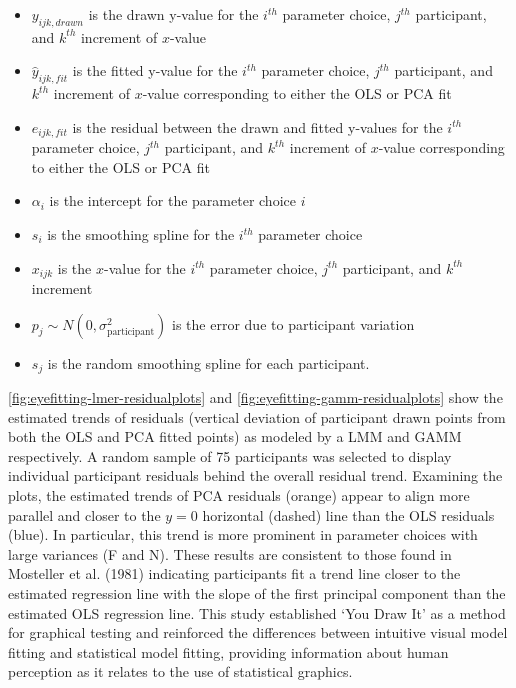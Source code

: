 \documentclass[print]{nuthesis}
\providecommand{\tightlist}{%
  \setlength{\itemsep}{0pt}\setlength{\parskip}{0pt}}
\begin{document}
\begin{itemize}
\tightlist
\item
  \(y_{ijk,drawn}\) is the drawn y-value for the \(i^{th}\) parameter choice, \(j^{th}\) participant, and \(k^{th}\) increment of \(x\)-value
\item
  \(\hat y_{ijk,fit}\) is the fitted y-value for the \(i^{th}\) parameter choice, \(j^{th}\) participant, and \(k^{th}\) increment of \(x\)-value corresponding to either the OLS or PCA fit
\item
  \(e_{ijk,fit}\) is the residual between the drawn and fitted y-values for the \(i^{th}\) parameter choice, \(j^{th}\) participant, and \(k^{th}\) increment of \(x\)-value corresponding to either the OLS or PCA fit
\item
  \(\alpha_i\) is the intercept for the parameter choice \(i\)
\item
  \(s_{i}\) is the smoothing spline for the \(i^{th}\) parameter choice
\item
  \(x_{ijk}\) is the \(x\)-value for the \(i^{th}\) parameter choice, \(j^{th}\) participant, and \(k^{th}\) increment
\item
  \(p_{j} \sim N(0, \sigma^2_\text{participant})\) is the error due to participant variation
\item
  \(s_{j}\) is the random smoothing spline for each participant.
\end{itemize}

\cref{fig:eyefitting-lmer-residualplots} and \cref{fig:eyefitting-gamm-residualplots} show the estimated trends of residuals (vertical deviation of participant drawn points from both the OLS and PCA fitted points) as modeled by a LMM and GAMM respectively.
A random sample of 75 participants was selected to display individual participant residuals behind the overall residual trend.
Examining the plots, the estimated trends of PCA residuals (orange) appear to align more parallel and closer to the \(y=0\) horizontal (dashed) line than the OLS residuals (blue).
In particular, this trend is more prominent in parameter choices with large variances (F and N).
These results are consistent to those found in Mosteller et al. (1981) indicating participants fit a trend line closer to the estimated regression line with the slope of the first principal component than the estimated OLS regression line.
This study established `You Draw It' as a method for graphical testing and reinforced the differences between intuitive visual model fitting and statistical model fitting, providing information about human perception as it relates to the use of statistical graphics.
\end{document}
